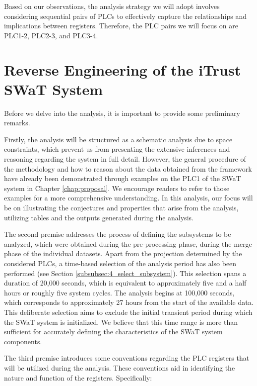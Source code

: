\bigskip
Based on our observations, the analysis strategy we will adopt involves considering sequential pairs of PLCs to effectively capture the relationships and implications between registers. Therefore, the PLC pairs we will focus on are PLC1-2, PLC2-3, and PLC3-4. 

\section{Reverse Engineering of the iTrust SWaT System}
\label{sec:6_reverse_SWaT}
Before we delve into the analysis, it is important to provide some preliminary remarks. 

\bigskip
Firstly, the analysis will be structured as a schematic analysis due to space constraints, which prevent us from presenting the extensive inferences and reasoning regarding the system in full detail. However, the general procedure of the methodology and how to reason about the data obtained from the framework have already been demonstrated through examples on the PLC1 of the SWaT system in Chapter \ref{chap:proposal}. We encourage readers to refer to those examples for a more comprehensive understanding. In this analysis, our focus will be on illustrating the conjectures and properties that arise from the analysis, utilizing tables and the outputs generated during the analysis.

\bigskip
The second premise addresses the process of defining the subsystems to be analyzed, which were obtained during the pre-processing phase, during the merge phase of the individual datasets. Apart from the projection determined by the considered PLCs, a time-based selection of the analysis period has also been performed (see Section \ref{subsubsec:4_select_subsystem}). This selection spans a duration of 20,000 seconds, which is equivalent to approximately five and a half hours or roughly five system cycles. The analysis begins at 100,000 seconds, which corresponds to approximately 27 hours from the start of the available data. This deliberate selection aims to exclude the initial transient period during which the SWaT system is initialized. We believe that this time range is more than sufficient for accurately defining the characteristics of the SWaT system components.

\bigskip
The third premise introduces some conventions regarding the PLC registers that will be utilized during the analysis. These conventions aid in identifying the nature and function of the registers. Specifically:

